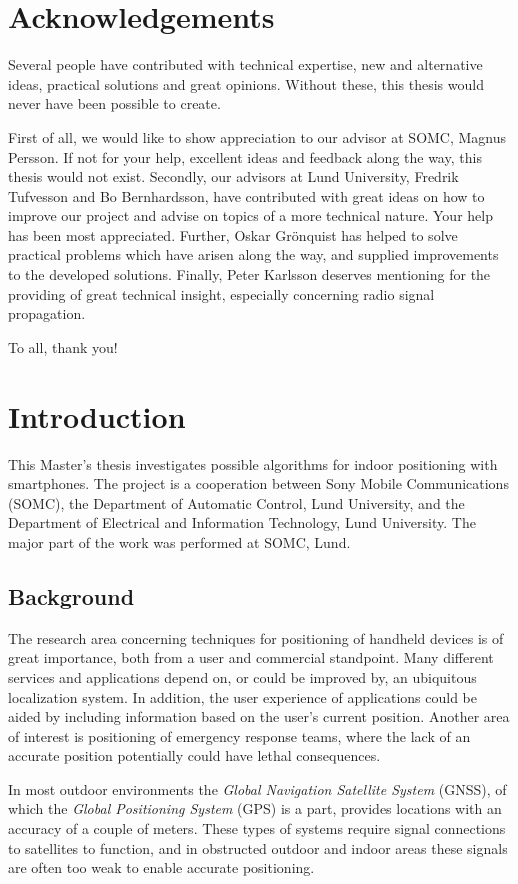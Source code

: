 \documentclass{LTHthesis}
\begin{document}
\chapter*{Acknowledgements}
Several people have contributed with technical expertise, new and alternative ideas, practical solutions and great opinions. Without these, this thesis would never have been possible to create. 

First of all, we would like to show appreciation to our advisor at SOMC, Magnus Persson. If not for your help, excellent ideas and feedback along the way, this thesis would not exist. Secondly, our advisors at Lund University, Fredrik Tufvesson and Bo Bernhardsson, have contributed with great ideas on how to improve our project and advise on topics of a more technical nature. Your help has been most appreciated. Further, Oskar Gr\"{o}nquist has helped to solve practical problems which have arisen along the way, and supplied improvements to the developed solutions. Finally, Peter Karlsson deserves mentioning for the providing of great technical insight, especially concerning radio signal propagation.     

To all, thank you!
\tableofcontents
\chapter{Introduction}

This Master's thesis investigates possible algorithms for indoor positioning with smartphones. The project is a cooperation between Sony Mobile Communications (SOMC), the Department of Automatic Control, Lund University, and the Department of Electrical and Information Technology, Lund University. The major part of the work was performed at SOMC, Lund.

\section{Background}
%
The research area concerning techniques for positioning of handheld devices is of great importance, both from a user and commercial standpoint. Many different services and applications depend on, or could be improved by, an ubiquitous localization system. In addition, the user experience of applications could be aided by including information based on the user's current position. Another area of interest is positioning of emergency response teams, where the lack of an accurate position potentially could have lethal consequences.
  
In most outdoor environments the \emph{Global Navigation Satellite System} (GNSS), of which the \emph{Global Positioning System} (GPS) is a part, provides locations with an accuracy of a couple of meters. These types of systems require signal connections to satellites to function, and in obstructed outdoor and indoor areas these signals are often too weak to enable accurate positioning. 
\end{document}
